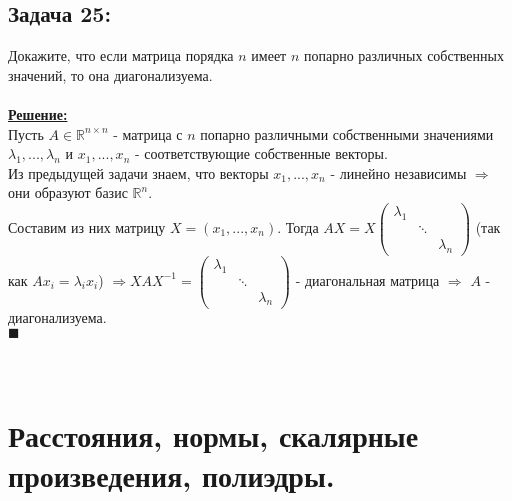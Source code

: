 \documentclass[a4paper,12pt,titlepage,final]{article}
\begin{document}
\subsection*{Задача 25:}
\noindent Докажите, что если матрица порядка $n$ имеет $n$ попарно различных собственных значений, то она диагонализуема. \\ \\
\textbf{\underline{Решение:}} \\
Пусть $A \in \mathbb{R}^{n \times n}$ - матрица с $n$ попарно различными собственными значениями $\lambda_1, ... , \lambda_n$ и 
$x_1, ... , x_n$ - соответствующие собственные векторы. \\
Из предыдущей задачи знаем, что векторы $x_1, ... , x_n$ - линейно независимы $\Rightarrow$ они образуют
базис $\mathbb{R}^n$. \\
Составим из них матрицу $X = (x_1, ... , x_n)$.
Тогда $AX = X
\begin{pmatrix}
    \lambda_1 & & \\
     & \ddots & \\
     & & \lambda_n
\end{pmatrix}
$ (так как $Ax_i = \lambda_i x_i$) $\Rightarrow XAX^{-1} =
\begin{pmatrix}
    \lambda_1 & & \\
     & \ddots & \\
     & & \lambda_n
\end{pmatrix}$ - диагональная матрица $\Rightarrow$ $A$ - диагонализуема. \\ $\blacksquare$ \\ \\ \\


\newpage
\section*{Расстояния, нормы, скалярные произведения, полиэдры.}
\end{document}
